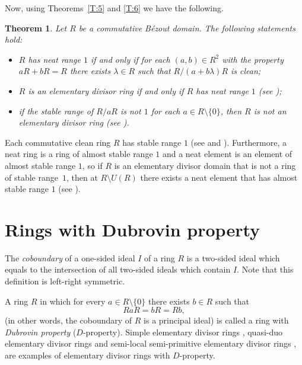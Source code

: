\documentclass[12pt,a4paper, reqno]{amsart}
\newtheorem{theorem}{Theorem}
\begin{document}
Now, using  Theorems~\ref{T:5} and  \ref{T:6} we have the following.

\begin{theorem}\label{T:7}
Let $R$ be a commutative B\'ezout domain. The following statements hold:
\begin{itemize}
\item[(i)] $R$ has neat range\/ $1$ if and only if for each $(a,b)\in R^2$ with the property  $aR+bR=R$ there exists $\lambda\in R$ such that $R/(a+b\lambda)R$ is clean;

\item[(ii)] $R$ is an elementary divisor ring if and only if\/ $R$ has neat range $1$ (see \cite[Theorem 33]{9-zabavsky});

\item[(iii)] if the stable range of\/ $R/aR$ is not\/ $1$ for each $a\in R\setminus\{0\}$,  then $R$ is not an elementary divisor ring
(see \cite[Theorem 5]{10-zabgat}).
\end{itemize}
\end{theorem}

Each  commutative clean ring $R$ has stable range $1$ (see  \cite[p.\,244]{6-mcGovern} and \cite[Proposition 1.8]{Nicholson_77}).
Furthermore, a neat ring is a ring of almost stable range $1$ and a neat element is an element of almost stable range $1$, so  if $R$ is an elementary divisor domain that is not a ring of stable range~$1$, then at $R\setminus U(R)$ there exists a neat element that has  almost stable range $1$
(see \cite[Theorem~7]{11-zabavsky}).

\section{Rings with Dubrovin property}

The {\it coboundary}  of a one-sided ideal $I$ of a ring $R$ is a  two-sided ideal which equals to the intersection of all two-sided ideals which contain $I$.     Note that this definition is  left-right symmetric.

A ring $R$ in  which for every   $a\in R\setminus\{0\}$ there exists  $b\in R$ such that
\begin{equation}\label{OOOjggT}
RaR=bR=Rb,
\end{equation}
(in other words, the  coboundary of $R$ is a   principal ideal) is called  a ring with {\it Dubrovin property} ($D$-property). Simple elementary divisor rings \cite[Section 4.2]{12-zabavsky},  quasi-duo elementary divisor rings \cite[Theorem 1]{15-Bowtell_Cohn} and  semi-local   semi-primitive elementary divisor rings \cite[Theorem 1]{14-dubrovin},
\cite{dubrovin_plus}  are examples of elementary divisor rings with $D$-property.
\end{document}
